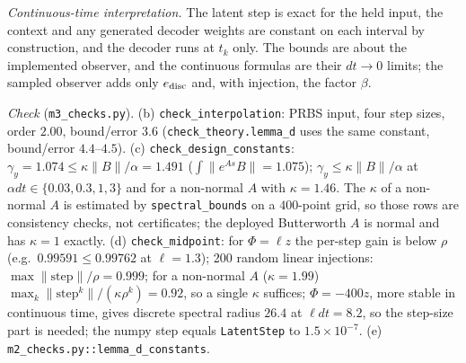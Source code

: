 \emph{Continuous-time interpretation.} The latent step is exact for the held input, the context and
any generated decoder weights are constant on each interval by construction, and the decoder runs
at $t_k$ only. The bounds are about the implemented observer, and the continuous formulas are their
$dt\to0$ limits; the sampled observer adds only $e_{\rm disc}$ and, with injection, the factor $\beta$.

{\sloppy\emph{Check} (\texttt{m3\_checks.py}). (b) \texttt{check\_interpolation}: PRBS input, four step
sizes, order $2.00$, bound/error $3.6$ (\texttt{check\_theory.lemma\_d} uses the same constant, bound/error $4.4$--$4.5$).
(c) \texttt{check\_design\_constants}: $\gamma_y=1.074\le\kappa\|B\|/\alpha=1.491$
($\int\|e^{As}B\|=1.075$); $\gamma_y\le\kappa\|B\|/\alpha$ at $\alpha dt\in\{0.03,0.3,1,3\}$ and for a
non-normal $A$ with $\kappa=1.46$. The $\kappa$ of a non-normal $A$ is estimated by \texttt{spectral\_bounds} on a
$400$-point grid, so those rows are consistency checks, not certificates; the deployed Butterworth $A$ is normal and has
$\kappa=1$ exactly. (d) \texttt{check\_midpoint}: for $\Phi=\ell z$ the per-step gain is
below $\rho$ (e.g.\ $0.99591\le0.99762$ at $\ell=1.3$); 200 random linear injections:
$\max\|\text{step}\|/\rho=0.999$; for a non-normal $A$ ($\kappa=1.99$) $\max_k\|\text{step}^k\|/(\kappa\rho^k)=0.92$, so a single $\kappa$ suffices; $\Phi=-400z$, more stable in continuous time, gives discrete spectral radius $26.4$ at $\ell dt=8.2$,
so the step-size part is needed; the numpy step equals \texttt{LatentStep} to $1.5\times10^{-7}$.
(e) \texttt{m2\_checks.py::lemma\_d\_constants}.\par}

